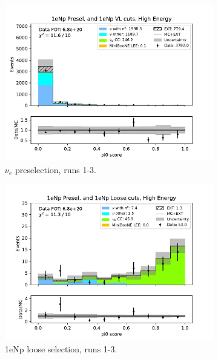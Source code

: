 \begin{figure}[H]
    \centering
    \begin{subfigure}{0.33\linewidth}
    \includegraphics[width=\linewidth]{technote/Sidebands/Figures/FarSideband/far_sideband_pi0_score_run123_NP_NP_HIGH_ENERGY.pdf}
    \caption{$\nu_e$ preselection, runs 1-3.}
    \end{subfigure}%
    \begin{subfigure}{0.33\linewidth}
    \includegraphics[width=\linewidth]{technote/Sidebands/Figures/FarSideband/far_sideband_pi0_score_run123_NP_NPL_HIGH_ENERGY.pdf}
    \caption{1eNp loose selection, runs 1-3.}
    \end{subfigure}%
    \begin{subfigure}{0.33\linewidth}

\end{subfigure}
\end{figure}
